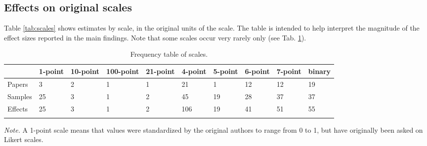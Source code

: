 \documentclass[
  man]{apa6}
\begin{document}
\subsection{Effects on original scales}\label{effects-on-original-scales}

Table \ref{tab:scales} shows estimates by scale, in the original units of the scale. The table is intended to help interpret the magnitude of the effect sizes reported in the main findings. Note that some scales occur very rarely only (see Tab. \ref{tab:n-scales}).

\begin{table}[tbp]

\begin{center}
\begin{threeparttable}

\caption{\label{tab:n-scales}Frequency table of scales.}

\begin{tabular}{llllllllll}
\toprule
 & \multicolumn{1}{c}{1-point} & \multicolumn{1}{c}{10-point} & \multicolumn{1}{c}{100-point} & \multicolumn{1}{c}{21-point} & \multicolumn{1}{c}{4-point} & \multicolumn{1}{c}{5-point} & \multicolumn{1}{c}{6-point} & \multicolumn{1}{c}{7-point} & \multicolumn{1}{c}{binary}\\
\midrule
Papers & 3 & 2 & 1 & 1 & 21 & 1 & 12 & 12 & 19\\
Samples & 25 & 3 & 1 & 2 & 45 & 19 & 28 & 37 & 37\\
Effects & 25 & 3 & 1 & 2 & 106 & 19 & 41 & 51 & 55\\
\bottomrule
\addlinespace
\end{tabular}

\begin{tablenotes}[para]
\normalsize{\textit{Note.} A 1-point scale means that values were standardized by the original authors to range from 0 to 1, but have originally been asked on Likert scales.}
\end{tablenotes}

\end{threeparttable}
\end{center}

\end{table}
\end{document}
